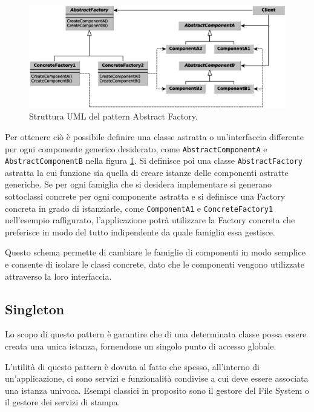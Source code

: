 \begin{figure}
\begin{center}
\includegraphics[width=13cm]{Immagini/AbstractFactoryPattern}
\caption{Struttura UML del pattern Abstract Factory.\label{f:abstractfactorypattern}} 
\end{center} 
\end{figure}

Per ottenere ciò è possibile definire una classe astratta o un'interfaccia differente per ogni componente generico desiderato, come \texttt{AbstractComponentA} e \texttt{AbstractComponentB} nella figura \ref{f:abstractfactorypattern}.
Si definisce poi una classe \texttt{AbstractFactory} astratta la cui funzione sia quella di creare istanze delle componenti astratte generiche. Se per ogni famiglia che si desidera implementare si generano sottoclassi concrete per ogni componente astratta e si definisce una Factory concreta in grado di istanziarle, come \texttt{ComponentA1} e \texttt{ConcreteFactory1} nell'esempio raffigurato, l'applicazione potrà utilizzare la Factory concreta che preferisce in modo del tutto indipendente da quale famiglia essa gestisce.

Questo schema permette di cambiare le famiglie di componenti in modo semplice e consente di isolare le classi concrete, dato che le componenti vengono utilizzate attraverso la loro interfaccia.

\subsection{Singleton}
\label{sub:singleton}
Lo scopo di questo pattern è garantire che di una determinata classe possa essere creata una unica istanza, fornendone un singolo punto di accesso globale.

L'utilità di questo pattern è dovuta al fatto che spesso, all'interno di un'applicazione, ci sono servizi e funzionalità condivise a cui deve essere associata una istanza univoca. Esempi classici in proposito sono il gestore del File System o il gestore dei servizi di stampa.

